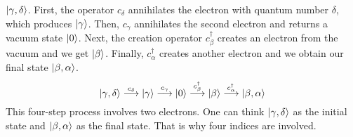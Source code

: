 $\Ket{\gamma,\delta}$. First, the operator $c_\delta$
annihilates the electron with quantum number $\delta$, which
produces $\Ket{\gamma}$. Then, $c_\gamma$ annihilates the second
electron and returns a vacuum state $\Ket{0}$. Next, the creation operator
$c_\beta^\dag$ creates an electron from the vacuum and we get $\Ket{\beta}$.
Finally, $c_\alpha^\dag$ creates another electron and we obtain our final state
$\Ket{\beta,\alpha}$.
\begin{equation*}
\Ket{\gamma,\delta}
\stackrel{c_\delta}{\longrightarrow}
\Ket{\gamma}
\stackrel{c_\gamma}{\longrightarrow}
\Ket{0}
\stackrel{c_\beta^\dag}{\longrightarrow}
\Ket{\beta}
\stackrel{c_\alpha^\dag}{\longrightarrow}
\Ket{\beta,\alpha}
\end{equation*}
%
This four-step process involves two electrons. One can think
$\Ket{\gamma,\delta}$ as the initial state and
$\Ket{\beta,\alpha}$ as the final state.
That is why four indices are involved.

